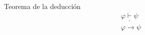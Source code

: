 \begin{ruleinf} \label{relinf_impadd} Teorema de la deducción 
	\begin{equation}
	\begin{gathered}
		\underline {\varphi \vdash \psi }\\
		\varphi \to \psi 
	\end{gathered}
	\end{equation}
\end{ruleinf}
